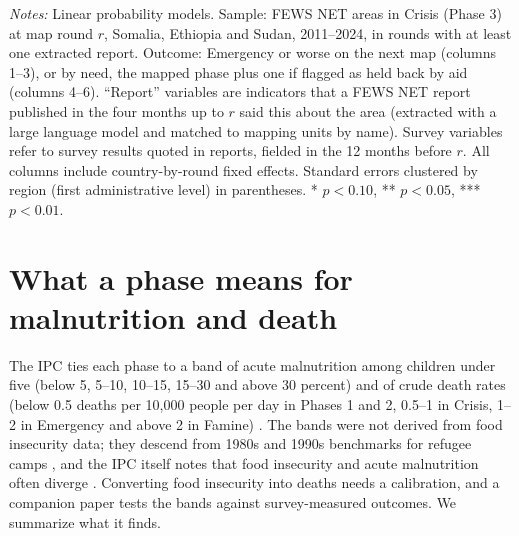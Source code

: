 \documentclass[11pt]{article}
\begin{document}
\begin{appendices}
\begin{table}[htbp]
\centering
\caption{Do FEWS NET's reports predict escalation from Crisis to Emergency beyond its maps?}\label{tab:text}
\scriptsize
\resizebox{\textwidth}{!}{}
\par\vspace{4pt}\begin{minipage}{\textwidth}\scriptsize \textit{Notes:} Linear probability models. Sample: FEWS NET areas in Crisis (Phase 3) at map round $r$, Somalia, Ethiopia and Sudan, 2011--2024, in rounds with at least one extracted report. Outcome: Emergency or worse on the next map (columns 1--3), or by need, the mapped phase plus one if flagged as held back by aid (columns 4--6). ``Report'' variables are indicators that a FEWS NET report published in the four months up to $r$ said this about the area (extracted with a large language model and matched to mapping units by name). Survey variables refer to survey results quoted in reports, fielded in the 12 months before $r$. All columns include country-by-round fixed effects. Standard errors clustered by region (first administrative level) in parentheses. * $p<0.10$, ** $p<0.05$, *** $p<0.01$.
\end{minipage}
\end{table}

\section{What a phase means for malnutrition and death}\label{app:phase}

The IPC ties each phase to a band of acute malnutrition among children under five (below 5, 5--10, 10--15, 15--30 and above 30 percent) and of crude death rates (below 0.5 deaths per 10,000 people per day in Phases 1 and 2, 0.5--1 in Crisis, 1--2 in Emergency and above 2 in Famine) \citep{IPC2021manual,ipcreftable}. The bands were not derived from food insecurity data; they descend from 1980s and 1990s benchmarks for refugee camps \citep{youngjaspars2009}, and the IPC itself notes that food insecurity and acute malnutrition often diverge \citep{ipc2016amn,ipc2024linkages}. Converting food insecurity into deaths needs a calibration, and a companion paper tests the bands against survey-measured outcomes. We summarize what it finds.


\end{appendices}
\end{document}
